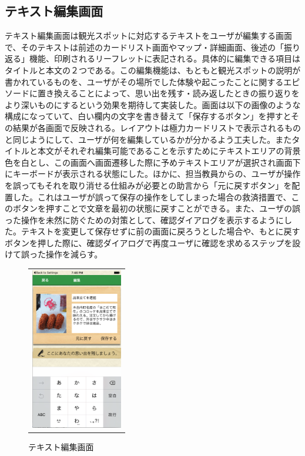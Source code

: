 \subsection{テキスト編集画面}
テキスト編集画面は観光スポットに対応するテキストをユーザが編集する画面で、そのテキストは前述のカードリスト画面やマップ・詳細画面、後述の「振り返る」機能、印刷されるリーフレットに表記される。具体的に編集できる項目はタイトルと本文の２つである。この編集機能は、もともと観光スポットの説明が書かれているものを、ユーザがその場所でした体験や起こったことに関するエピソードに置き換えることによって、思い出を残す・読み返したときの振り返りをより深いものにするという効果を期待して実装した。画面は以下の画像のような構成になっていて、白い欄内の文字を書き替えて「保存するボタン」を押すとその結果が各画面で反映される。レイアウトは極力カードリストで表示されるものと同じようにして、ユーザが何を編集しているかが分かるよう工夫した。またタイトルと本文がそれぞれ編集可能であることを示すためにテキストエリアの背景色を白とし、この画面へ画面遷移した際に予めテキストエリアが選択され画面下にキーボードが表示される状態にした。ほかに、担当教員からの、ユーザが操作を誤ってもそれを取り消せる仕組みが必要との助言から「元に戻すボタン」を配置した。これはユーザが誤って保存の操作をしてしまった場合の救済措置で、このボタンを押すことで文章を最初の状態に戻すことができる。また、ユーザの誤った操作を未然に防ぐための対策として、確認ダイアログを表示するようにした。テキストを変更して保存せずに前の画面に戻ろうとした場合や、もとに戻すボタンを押した際に、確認ダイアログで再度ユーザに確認を求めるステップを設けて誤った操作を減らす。
\newpage

\begin{figure}[htbp]
  \begin{center}
    \begin{tabular}{c}

      \begin{minipage}{0.33\hsize}
        \begin{center}
\includegraphics[width=4cm, bb=0 0 303 573]{kiko_edit.png}
        \end{center}
      \end{minipage}

    \end{tabular}
    \caption{テキスト編集画面}
    \label{fig:lena}
  \end{center}
\end{figure}

